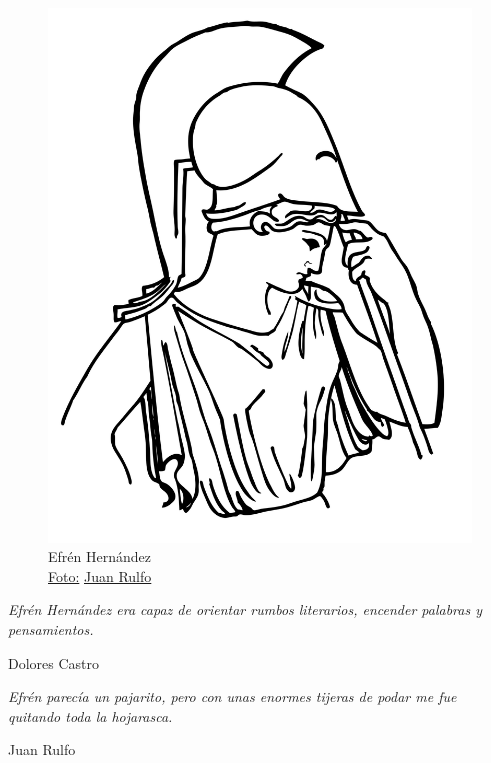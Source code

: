 \documentclass[14pt,twoside,final]{extbook} %
\begin{document}
\begin{figure}[H]
\centering
{}
\includegraphics[width=\textwidth]{02}
\vspace{2pt} \\
Efrén Hernández
\vspace*{14pt} \\

\href{https://queridobartleby.es/wp-content/uploads/2021/05/Efren-Hernandez.jpg}{Foto:} \href{Tomada del blog: https://queridobartleby.es/}{Juan Rulfo\textcopyright}
\end{figure}
\vfill
\newpage
\pagestyle{empty}
\vspace*{42pt}
\begin{flushright}
\begin{minipage}{7.5cm}
\emph{Efrén Hernández era capaz de orientar rumbos literarios, encender palabras y pensamientos.}
\begin{flushright}
Dolores Castro
\end{flushright}
\vspace*{28pt}
\emph{Efrén parecía un pajarito, pero con unas enormes tijeras de podar me fue quitando toda la hojarasca.}
\begin{flushright}
Juan Rulfo
\end{flushright}
\end{minipage}
\end{flushright}
\end{document}
